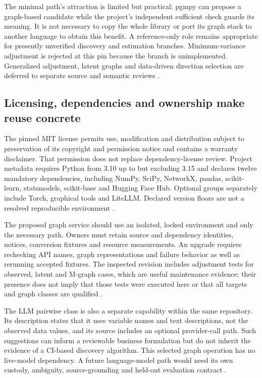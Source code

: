 The minimal path's attraction is limited but practical: pgmpy can propose
a graph-based candidate while the project's independent sufficient check
guards its meaning. It is not necessary to copy the whole library or
port its graph stack to another language to obtain this benefit. A
reference-only role remains appropriate for presently unverified discovery
and estimation branches. Minimum-variance adjustment is rejected at this
pin because the branch is unimplemented. Generalized adjustment, latent
graphs and data-driven direction selection are deferred to separate
source and semantic reviews \citep{exec13_pgmpy_reuse_primary}.

\subsection{Licensing, dependencies and ownership make reuse concrete}

The pinned MIT license permits use, modification and distribution subject
to preservation of its copyright and permission notice and contains a
warranty disclaimer. That permission does not replace dependency-license
review. Project metadata requires Python from 3.10 up to but excluding
3.15 and declares twelve mandatory dependencies, including NumPy,
SciPy, NetworkX, pandas, scikit-learn, statsmodels, scikit-base and
Hugging Face Hub. Optional groups separately include Torch, graphical
tools and LiteLLM. Declared version floors are not a resolved reproducible
environment \citep{exec13_pgmpy_reuse_primary}.

The proposed graph service should use an isolated, locked environment and
only the necessary path. Owners must retain source and dependency identities,
notices, conversion fixtures and resource measurements. An upgrade requires
rechecking API names, graph representations and failure behavior as well as
rerunning accepted fixtures. The inspected revision includes adjustment
tests for observed, latent and M-graph cases, which are useful maintenance
evidence; their presence does not imply that those tests were executed here
or that all targets and graph classes are qualified
\citep{exec13_pgmpy_reuse_primary}.

The LLM pairwise class is also a separate capability within the same
repository. Its description states that it uses variable names and text
descriptions, not the observed data values, and its source includes an
optional provider-call path. Such suggestions can inform a reviewable
business formulation but do not inherit the evidence of a CI-based
discovery algorithm. This selected graph operation has no live-model
dependency. A future language-model path would need its own custody,
ambiguity, source-grounding and held-out evaluation contract
\citep{exec13_pgmpy_reuse_primary}.

